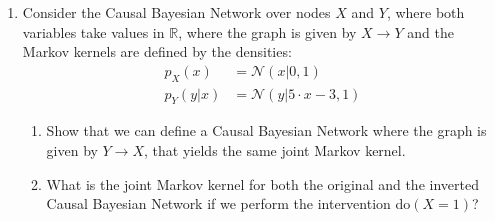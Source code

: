 \begin{enumerate}
  \begin{ungradedsolution}
    We have
    \begin{align*}
      \mat{X \\ Y} \sim \mathcal{N}\left( \mat{\mu_1\\ a\cdot\mu_1 + \mu_2}, \Sigma\right) \quad \text{with} \quad \Sigma := \mat{\sigma_1^2 & a\sigma_1^2 \\ a \sigma_1^2 & a^2 \sigma_1^2 + \sigma_2^2}
    \end{align*}
    and
    \begin{align*}
      P(Z|X, Y) & = \mathcal{N}\left(A\mat{X \\Y} + \mu_3, \sigma^2_3\right)
    \end{align*}
    where $A = \mat{c, b}$, and so
    \begin{align*}
      \mat{X \\ Y \\ Z} \sim \mathcal{N}\left(\mat{\mu_1\\ a\mu_1+\mu_2 \\ b(a\mu_1 + \mu_2) + c\mu_1 + \mu_3}, \mat{\Sigma & \Sigma A^\top \\ A\Sigma & \sigma_3^2 + A\Sigma A^\top}\right),
    \end{align*}
    Then we see that $\textrm{Cov}(X, Z) = (A\Sigma)_1 = (ab+c)\sigma_1^2 = 0$ whenever $ab+c=0$, so for these parameters we have $X\Indep Z$. Since $X$ is not d-separated from $Z$ in $G$, this is a faithfulness violation.
  \end{ungradedsolution}

  \item %
  Consider the Causal Bayesian Network over nodes $X$ and $Y$, where both variables take values in $\mathbb{R}$, where the graph is given by $X \rightarrow Y$ and the Markov kernels are defined by the densities:
  \begin{align*}
    p_X(x)   & = \mathcal{N}(x|0,1)            \\
    p_Y(y|x) & = \mathcal{N}(y|5\cdot x -3, 1)
  \end{align*}
  \begin{enumerate}
    \item Show that we can define a Causal Bayesian Network where the graph is given by $Y \rightarrow X$, that yields the same joint Markov kernel.
    \item What is the joint Markov kernel for both the original and the inverted Causal Bayesian Network if we perform the intervention do$(X=1)$?
  \end{enumerate}


\end{enumerate}
